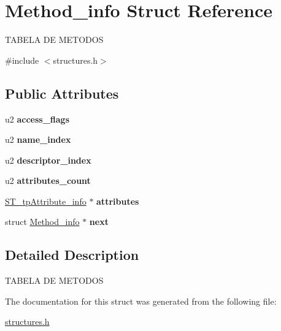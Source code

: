 \hypertarget{structMethod__info}{}\section{Method\+\_\+info Struct Reference}
\label{structMethod__info}




 T\+A\+B\+E\+LA DE M\+E\+T\+O\+D\+OS  




{\ttfamily \#include $<$structures.\+h$>$}

\subsection*{Public Attributes}
\begin{DoxyCompactItemize}
\item 
\mbox{\label{structMethod__info_a8268df783791ecaea19390ea29acd948}} 
u2 {\bfseries access\+\_\+flags}
\item 
\mbox{\label{structMethod__info_a36cd72ed440f6357ef4c777d56a58cd5}} 
u2 {\bfseries name\+\_\+index}
\item 
\mbox{\label{structMethod__info_ad3445921db5b20bcd3e5e8aa10d16c3b}} 
u2 {\bfseries descriptor\+\_\+index}
\item 
\mbox{\label{structMethod__info_a3d4d1bac8952513abdfa2f3987b11730}} 
u2 {\bfseries attributes\+\_\+count}
\item 
\mbox{\label{structMethod__info_a1100cb4278e0650fb1dff0313120c1d8}} 
\mbox{\hyperlink{structures_8h_a4ad50728b2ffc8af625f1237e03bc9e0}{S\+T\+\_\+tp\+Attribute\+\_\+info}} $\ast$ {\bfseries attributes}
\item 
\mbox{\label{structMethod__info_aa7aef6b2c165ce9c15a91d2f43f06d89}} 
struct \mbox{\hyperlink{structMethod__info}{Method\+\_\+info}} $\ast$ {\bfseries next}
\end{DoxyCompactItemize}


\subsection{Detailed Description}


 T\+A\+B\+E\+LA DE M\+E\+T\+O\+D\+OS 

The documentation for this struct was generated from the following file\+:\begin{DoxyCompactItemize}
\item 
\mbox{\hyperlink{structures_8h}{structures.\+h}}\end{DoxyCompactItemize}
